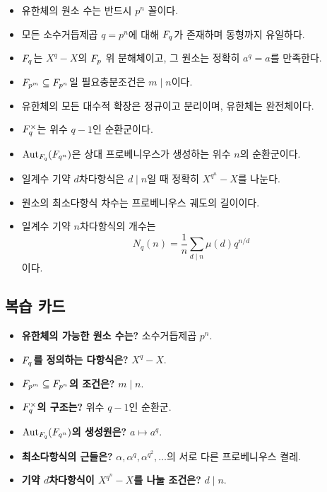 \begin{chapterreview}
\begin{itemize}
  \item 유한체의 원소 수는 반드시 $p^n$ 꼴이다.
  \item 모든 소수거듭제곱 $q=p^n$에 대해 $F_q$가 존재하며 동형까지 유일하다.
  \item $F_q$는 $X^q-X$의 $F_p$ 위 분해체이고, 그 원소는 정확히 $a^q=a$를 만족한다.
  \item $F_{p^m}\subseteq F_{p^n}$일 필요충분조건은 $m\mid n$이다.
  \item 유한체의 모든 대수적 확장은 정규이고 분리이며, 유한체는 완전체이다.
  \item $F_q^\times$는 위수 $q-1$인 순환군이다.
  \item $\operatorname{Aut}_{F_q}(F_{q^n})$은 상대 프로베니우스가 생성하는 위수 $n$의 순환군이다.
  \item 일계수 기약 $d$차다항식은 $d\mid n$일 때 정확히 $X^{q^n}-X$를 나눈다.
  \item 원소의 최소다항식 차수는 프로베니우스 궤도의 길이이다.
  \item 일계수 기약 $n$차다항식의 개수는
  \[
    N_q(n)=\frac1n\sum_{d\mid n}\mu(d)q^{n/d}
  \]
  이다.
\end{itemize}
\end{chapterreview}

\subsection*{복습 카드}

\begin{itemize}
  \item \textbf{유한체의 가능한 원소 수는?} 소수거듭제곱 $p^n$.
  \item \textbf{$F_q$를 정의하는 다항식은?} $X^q-X$.
  \item \textbf{$F_{p^m}\subseteq F_{p^n}$의 조건은?} $m\mid n$.
  \item \textbf{$F_q^\times$의 구조는?} 위수 $q-1$인 순환군.
  \item \textbf{$\operatorname{Aut}_{F_q}(F_{q^n})$의 생성원은?} $a\mapsto a^q$.
  \item \textbf{최소다항식의 근들은?} $\alpha,\alpha^q,\alpha^{q^2},\dots$의 서로 다른 프로베니우스 켤레.
  \item \textbf{기약 $d$차다항식이 $X^{q^n}-X$를 나눌 조건은?} $d\mid n$.
\end{itemize}
